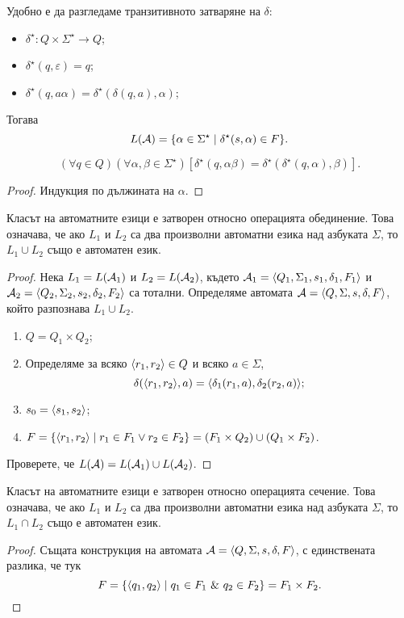 Удобно е да разгледаме транзитивното затваряне на $\delta$:
\begin{itemize}
\item
  $\delta^\star : Q\times\Sigma^\star \to Q$;
\item 
  $\delta^\star(q,\varepsilon) = q$;
\item
  $\delta^\star(q,a\alpha) = \delta^\star(\delta(q,a),\alpha)$;
\end{itemize}
Тогава \[L(\mathcal{A}) = \{\alpha\in\Sigma^\star \mid \delta^\star(s,\alpha) \in F\}.\]

\begin{prop}
  \[(\forall q\in Q)(\forall\alpha,\beta\in\Sigma^\star)[\delta^\star(q,\alpha\beta) = \delta^\star(\delta^\star(q,\alpha),\beta)].\]
\end{prop}
\begin{proof}
  Индукция по дължината на $\alpha$.
\end{proof}

\begin{thm}
  Класът на автоматните езици е затворен относно операцията обединение.
  Това означава, че ако $L_1$ и $L_2$ са два произволни автоматни езика над азбуката $\Sigma$, то $L_1\cup L_2$
  също е автоматен език.
\end{thm}
\begin{proof}
  Нека $L_1 = L(\mathcal{A}_1)$ и $L_2 = L(\mathcal{A}_2)$, 
  където $\mathcal{A}_1 = \langle{Q_1,\Sigma_1,s_1,\delta_1,F_1}\rangle$ и $\mathcal{A}_2 = \langle{Q_2,\Sigma_2,s_2,\delta_2,F_2}\rangle$ са тотални.
  Определяме автомата $\mathcal{A} = \langle{Q,\Sigma,s,\delta,F}\rangle$, който разпознава $L_1\cup L_2$.
  \begin{enumerate}[1)]
  \item
    $Q = Q_1\times Q_2$;
  \item
    Определяме за всяко $\langle{r_1,r_2}\rangle \in Q$ и всяко $a \in \Sigma$,
    \[\delta(\langle{r_1,r_2}\rangle,a) = \langle{\delta_1(r_1,a),\delta_2(r_2,a)}\rangle;\]
  \item
    $s_0 = \langle{s_1,s_2}\rangle$;
  \item
    $F = \{\langle{r_1,r_2}\rangle\mid r_1\in F_1\vee r_2 \in F_2\} = (F_1\times Q_2)\cup (Q_1\times F_2)$.
  \end{enumerate}
  Проверете, че $L(\mathcal{A}) = L(\mathcal{A}_1)\cup L(\mathcal{A}_2)$.
\end{proof}

\begin{cor}
  Класът на автоматните езици е затворен относно операцията сечение.
  Това означава, че ако $L_1$ и $L_2$ са два произволни автоматни езика над азбуката $\Sigma$, то $L_1\cap L_2$
  също е автоматен език.
\end{cor}
\begin{proof}
  Същата конструкция на автомата $\mathcal{A} = \langle{Q,\Sigma,s,\delta,F}\rangle$, 
  с единствената разлика, че тук 
  \[F = \{\pair{q_1,q_2} \mid q_1 \in F_1\ \&\ q_2 \in F_2\} = F_1\times F_2.\]
\end{proof}

